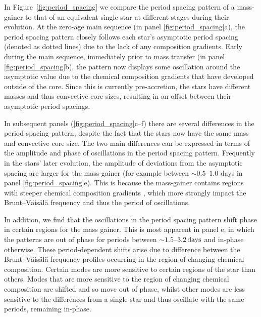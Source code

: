 \documentclass[desactivate]{aa}
\begin{document}
In Figure~\ref{fig:period_spacing} we compare the period spacing pattern of a mass-gainer to that of an equivalent single star at different stages during their evolution. At the zero-age main sequence (in panel \ref{fig:period_spacing}a), the period spacing pattern closely follows each star's asymptotic period spacing (denoted as dotted lines) due to the lack of any composition gradients. Early during the main sequence, immediately prior to mass transfer (in panel \ref{fig:period_spacing}b), the pattern now displays some oscillation around the asymptotic value due to the chemical composition gradients that have developed outside of the core. Since this is currently pre-accretion, the stars have different masses and thus convective core sizes, resulting in an offset between their asymptotic period spacings.

In subsequent panels (\ref{fig:period_spacing}c--f) there are several differences in the period spacing pattern, despite the fact that the stars now have the same mass and convective core size. The two main differences can be expressed in terms of the amplitude and phase of oscillations in the period spacing pattern. Frequently in the stars' later evolution, the amplitude of deviations from the asymptotic spacing are larger for the mass-gainer (for example between ${\sim}0.5$--$1.0$ days in panel \ref{fig:period_spacing}e). This is because the mass-gainer contains regions with steeper chemical composition gradients \citep{Renzo+2023}, which more strongly impact the Brunt–Väisälä frequency and thus the period of oscillations.



In addition, we find that the oscillations in the period spacing pattern shift phase in certain regions for the mass gainer. This is most apparent in panel e, in which the patterns are out of phase for periods between ${\sim}1.5$--$3.2 \, {\rm days}$ and in-phase otherwise. These period-dependent shifts arise due to difference between the Brunt–Väisälä frequency profiles occurring in the region of changing chemical composition. Certain modes are more sensitive to certain regions of the star than others. Modes that are more sensitive to the region of changing chemical composition are shifted and so move out of phase, whilst other modes are less sensitive to the differences from a single star and thus oscillate with the same periods, remaining in-phase.
\end{document}
